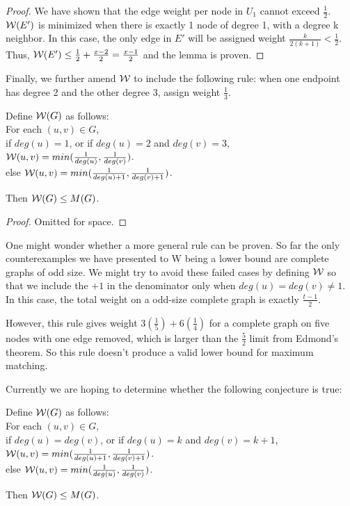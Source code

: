\begin{proof}
We have shown that the edge weight per node in $U_1$ cannot exceed $\frac{1}{2}$.  $\mathcal {W}(E')$ is minimized when there is exactly 1 node of degree 1, with a degree k neighbor. In this case, the only edge in $E'$ will be assigned weight $\frac{k}{2(k+1)}<\frac{1}{2}$.  Thus, $\mathcal {W}(E') \leq \frac{1}{2} + \frac{x-2}{2} = \frac{x-1}{2}$ and the lemma is proven.  
\end{proof}

Finally, we further amend $\mathcal {W}$ to include the following rule:  when one endpoint has degree 2 and the other degree 3, assign weight $\frac{1}{3}$.

\begin{lemma}
Define $\mathcal {W}(G)$ as follows:\\
For each $(u,v) \in G$,\\
if $deg(u) = 1$, or if $deg(u) = 2$ and $deg(v) = 3$, $\mathcal {W}(u,v) =  min(\frac{1}{deg(u)},\frac{1}{deg(v)})$.\\
else $\mathcal {W}(u,v) =  min(\frac{1}{deg(u)+1},\frac{1}{deg(v)+1})$.

Then $\mathcal {W}(G) \leq M(G)$.
\end{lemma}
\begin{proof}
Omitted for space.
\end{proof}

One might wonder whether a more general rule can be proven.  So far the only counterexamples we have presented to W being a lower bound are complete graphs of odd size.  We might try to avoid these failed cases by defining $\mathcal {W}$ so that we include the $+1$ in the denominator only when $deg(u) = deg(v) \neq 1$.  In this case, the total weight on a odd-size complete graph is exactly $\frac{t-1}{2}$.

However, this rule gives weight $3(\frac{1}{5}) + 6(\frac{1}{4})$ for a complete graph on five nodes with one edge removed, which is larger than the $\frac{5}{2}$ limit from Edmond's theorem.  So this rule doesn't produce a valid lower bound for maximum matching. 

Currently we are hoping to determine whether the following conjecture is true:
\begin{conjecture}
Define $\mathcal {W}(G)$ as follows:\\
For each $(u,v) \in G$,\\
if $deg(u) = deg(v)$, or if $deg(u) = k$ and $deg(v) = k+1$,$\mathcal {W}(u,v) =  min(\frac{1}{deg(u)+1},\frac{1}{deg(v)+1})$.\\
else $\mathcal {W}(u,v) =  min(\frac{1}{deg(u)},\frac{1}{deg(v)})$.

Then $\mathcal {W}(G) \leq M(G)$.
\end{conjecture}
